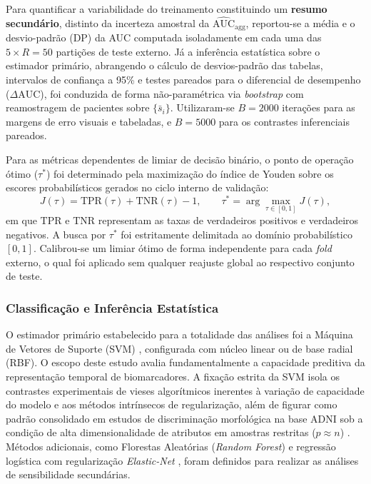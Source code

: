 \documentclass[review]{elsarticle}
\begin{document}
	Para quantificar a variabilidade do treinamento constituindo um \textbf{resumo secundário}, distinto da incerteza amostral da $\widehat{\mathrm{AUC}}_{\mathrm{agg}}$, reportou-se a média e o desvio-padrão (DP) da AUC computada isoladamente em cada uma das $5 \times R = 50$ partições de teste externo. Já a inferência estatística sobre o estimador primário, abrangendo o cálculo de desvios-padrão das tabelas, intervalos de confiança a 95\% e testes pareados para o diferencial de desempenho ($\Delta\mathrm{AUC}$), foi conduzida de forma não-paramétrica via \emph{bootstrap} com reamostragem de pacientes sobre $\{\bar{s}_i\}$. Utilizaram-se $B=2000$ iterações para as margens de erro visuais e tabeladas, e $B=5000$ para os contrastes inferenciais pareados.
	
	Para as métricas dependentes de limiar de decisão binário, o ponto de operação ótimo ($\tau^*$) foi determinado pela maximização do índice de Youden sobre os escores probabilísticos gerados no ciclo interno de validação:
	\begin{equation}
		J(\tau) = \mathrm{TPR}(\tau) + \mathrm{TNR}(\tau) - 1,
		\qquad
		\tau^{*} = \arg\max_{\tau \in [0,1]} J(\tau),
		\label{eq:youden}
	\end{equation}
	em que $\mathrm{TPR}$ e $\mathrm{TNR}$ representam as taxas de verdadeiros positivos e verdadeiros negativos. A busca por $\tau^*$ foi estritamente delimitada ao domínio probabilístico $[0,1]$. Calibrou-se um limiar ótimo de forma independente para cada \emph{fold} externo, o qual foi aplicado sem qualquer reajuste global ao respectivo conjunto de teste. 
	
	\subsubsection{Classificação e Inferência Estatística}
	
	O estimador primário estabelecido para a totalidade das análises foi a Máquina de Vetores de Suporte (SVM) \cite{cortes-1995}, configurada com núcleo linear ou de base radial (RBF). O escopo deste estudo avalia fundamentalmente a capacidade preditiva da representação temporal de biomarcadores. A fixação estrita da SVM isola os contrastes experimentais de vieses algorítmicos inerentes à variação de capacidade do modelo e aos métodos intrínsecos de regularização, além de figurar como padrão consolidado em estudos de discriminação morfológica na base ADNI sob a condição de alta dimensionalidade de atributos em amostras restritas ($p \approx n$) \cite{cuingnet-2011}. Métodos adicionais, como Florestas Aleatórias (\emph{Random Forest}) \cite{breiman-2001} e regressão logística com regularização \emph{Elastic-Net} \cite{zou-2005}, foram definidos para realizar as análises de sensibilidade secundárias. 
	
\end{document}
